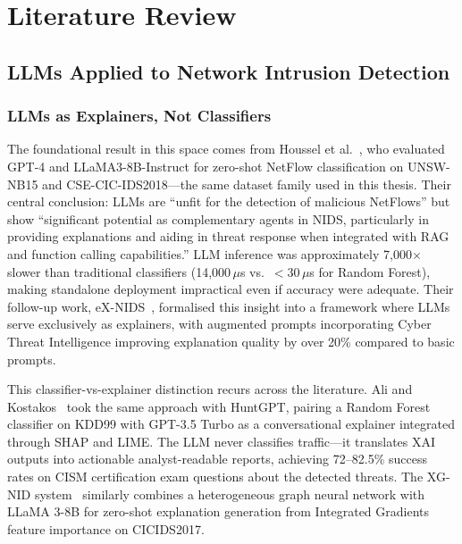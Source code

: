 \documentclass[12pt, a4paper, oneside]{report}
\begin{document}
\chapter{Literature Review}
\label{ch:litreview}

\section{LLMs Applied to Network Intrusion Detection}
\label{sec:llm-nids}

\subsection{LLMs as Explainers, Not Classifiers}

The foundational result in this space comes from Houssel et al.~\cite{houssel2024towards},
who evaluated GPT-4 and LLaMA3-8B-Instruct for zero-shot NetFlow classification on
UNSW-NB15 and CSE-CIC-IDS2018---the same dataset family used in this thesis. Their
central conclusion: LLMs are ``unfit for the detection of malicious NetFlows'' but
show ``significant potential as complementary agents in NIDS, particularly in
providing explanations and aiding in threat response when integrated with RAG
and function calling capabilities.'' LLM inference was approximately 7,000$\times$
slower than traditional classifiers (14,000\,$\mu$s vs.\ $<$30\,$\mu$s for Random
Forest), making standalone deployment impractical even if accuracy were adequate.
Their follow-up work, eX-NIDS~\cite{houssel2025exnids}, formalised this insight
into a framework where LLMs serve exclusively as explainers, with augmented prompts
incorporating Cyber Threat Intelligence improving explanation quality by over 20\%
compared to basic prompts.

This classifier-vs-explainer distinction recurs across the literature. Ali and
Kostakos~\cite{ali2023huntgpt} took the same approach with HuntGPT, pairing a
Random Forest classifier on KDD99 with GPT-3.5 Turbo as a conversational explainer
integrated through SHAP and LIME. The LLM never classifies traffic---it translates
XAI outputs into actionable analyst-readable reports, achieving 72--82.5\% success
rates on CISM certification exam questions about the detected threats. The XG-NID
system~\cite{xgnid2024} similarly combines a heterogeneous graph neural network
with LLaMA 3-8B for zero-shot explanation generation from Integrated Gradients
feature importance on CICIDS2017.
\end{document}
